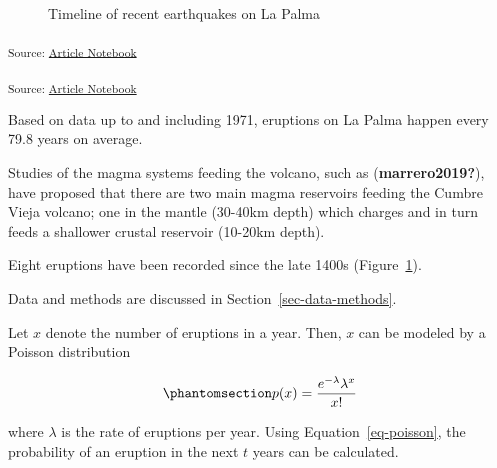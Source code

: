 \documentclass[
]{agujournal2019}
\begin{document}
\label{cell-fig-timeline}
\begin{figure}[H]


\caption{\label{fig-timeline}Timeline of recent earthquakes on La Palma}

\end{figure}%

\textsubscript{Source:
\href{https://rvcrawford.github.io/glowing-system/index.qmd.html}{Article
Notebook}}

\textsubscript{Source:
\href{https://rvcrawford.github.io/glowing-system/index.qmd.html}{Article
Notebook}}

Based on data up to and including 1971, eruptions on La Palma happen
every 79.8 years on average.

Studies of the magma systems feeding the volcano, such as
(\textbf{marrero2019?}), have proposed that there are two main magma
reservoirs feeding the Cumbre Vieja volcano; one in the mantle (30-40km
depth) which charges and in turn feeds a shallower crustal reservoir
(10-20km depth).

Eight eruptions have been recorded since the late 1400s
(Figure~\ref{fig-timeline}).

Data and methods are discussed in Section~\ref{sec-data-methods}.

Let \(x\) denote the number of eruptions in a year. Then, \(x\) can be
modeled by a Poisson distribution

\begin{equation}\phantomsection\label{eq-poisson}{
p(x) = \frac{e^{-\lambda} \lambda^{x}}{x !}
}\end{equation}

where \(\lambda\) is the rate of eruptions per year. Using
Equation~\ref{eq-poisson}, the probability of an eruption in the next
\(t\) years can be calculated.
\end{document}
